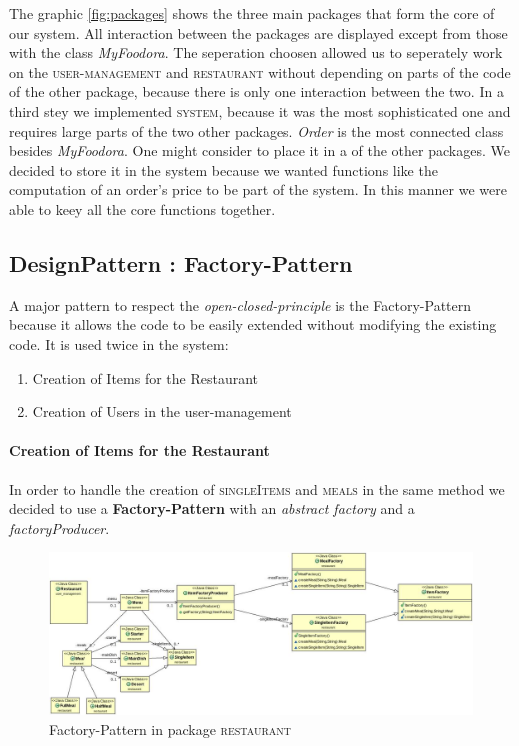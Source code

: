 The graphic \ref{fig:packages} shows the three main packages that form the core of our system. All
interaction between the packages are displayed except from those with the class
\textit{MyFoodora}. The seperation choosen allowed us to seperately work on the
\textsc{user-management} and \textsc{restaurant} without depending on parts of the code of the
other package, because there is only one interaction between the two. In a third stey we
implemented \textsc{system}, because it was the most sophisticated one and requires large parts of
the two other packages. \textit{Order} is the most connected class besides \textit{MyFoodora}. One
might consider to place it in a of the other packages. We decided to store it in the system
because we wanted functions like the computation of an order's price to be part of the system. In
this manner we were able to keey all the core functions together. 

\subsection{DesignPattern : Factory-Pattern}
\label{sub:designpattern_factory_pattern}

A major pattern to respect the \textit{open-closed-principle} is the Factory-Pattern because it
allows the code to be easily extended without modifying the existing code. It is used twice in
the system:
\begin{enumerate}
	\item Creation of Items for the Restaurant
	\item Creation of Users in the user-management
\end{enumerate}

\paragraph{Creation of Items for the Restaurant}

In order to handle the creation of \textsc{singleItems} and \textsc{meals} in the same method we 
decided to use a \textbf{Factory-Pattern} with an \textit{abstract factory} and a
\textit{factoryProducer}. 

\begin{figure}[H]
	\centering
	\includegraphics[width=1\linewidth]{./ima/restaurant_factory_pattern.jpg}
	\caption{Factory-Pattern in package \textsc{restaurant}}
	\label{fig:restaurant-factory-pattern}
\end{figure}


